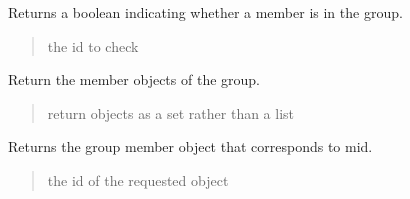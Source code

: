 \documentclass[letterpaper,12pt,english]{sphinxmanual}
\begin{document}
\begin{fulllineitems}
\begin{fulllineitems}
\end{fulllineitems}


\begin{fulllineitems}
\label{\detokenize{api/core:cbmpy.CBModel.Group.hasMember}}
\pysigstartsignatures
\pysiglinewithargsret
{}
{}
{}
\pysigstopsignatures
\sphinxAtStartPar
Returns a boolean indicating whether a member is in the group.
\begin{quote}\begin{description}
\sphinxAtStartPar
{} \textendash{} the id to check

\end{description}\end{quote}

\end{fulllineitems}


\begin{fulllineitems}
\label{\detokenize{api/core:cbmpy.CBModel.Group.getMembers}}
\pysigstartsignatures
\pysiglinewithargsret
{}
{}
{}
\pysigstopsignatures
\sphinxAtStartPar
Return the member objects of the group.
\begin{quote}\begin{description}
\sphinxAtStartPar
{} \textendash{} return objects as a set rather than a list

\end{description}\end{quote}

\end{fulllineitems}


\begin{fulllineitems}
\label{\detokenize{api/core:cbmpy.CBModel.Group.getMember}}
\pysigstartsignatures
\pysiglinewithargsret
{}
{}
{}
\pysigstopsignatures
\sphinxAtStartPar
Returns the group member object that corresponds to mid.
\begin{quote}\begin{description}
\sphinxAtStartPar
{} \textendash{} the id of the requested object


\end{description}
\end{quote}
\end{fulllineitems}
\end{fulllineitems}
\end{document}
